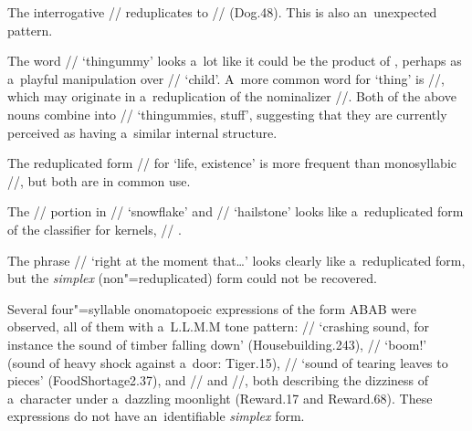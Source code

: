 			The interrogative // reduplicates to // (Dog.48). This
			is also an~unexpected pattern.
			
			The word // ‘thingummy’ looks a~lot like it could be
			the product of , perhaps as a~playful manipulation over // ‘child’. A~more
			common word for ‘thing’ is //, which may originate in a~reduplication of the
			nominalizer //. Both of the above nouns combine into
			// ‘thingummies, stuff’,
			suggesting that they are currently perceived as having a~similar
			internal structure.
			
			The reduplicated form // for ‘life, existence’ is more frequent than
			{monosyllabic} //, but both are in common use.
			
			The // portion in // ‘snowflake’ and
			// ‘hailstone’ looks like a~reduplicated form of the classifier for kernels, // \citep[xxxiv]{lidz2010}.
			
			The phrase // ‘right at the moment that{\dots}’ looks clearly like
			a~reduplicated form, but the \textit{simplex} (non"=reduplicated) form could not be recovered.
			
			Several four"=syllable onomatopoeic expressions of the form ABAB were observed, all of them with
			a~L.L.M.M tone pattern: // ‘crashing sound, for instance the sound of timber falling down’
			(Housebuilding.243), // ‘boom!’ (sound of heavy shock against a~door: Tiger.15),
			// ‘sound of tearing leaves to pieces’ (FoodShortage2.37), and
			// and //, both describing the dizziness of {\linebreak}a~character
			under a~dazzling moonlight (Reward.17 and Reward.68). These expressions do not have an~identifiable \textit{simplex} form.
            

